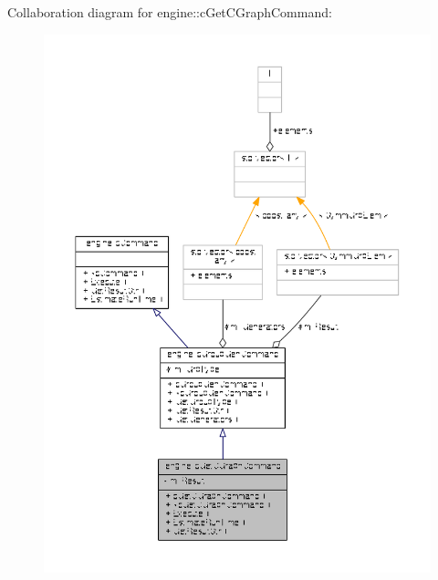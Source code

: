 Collaboration diagram for engine\-:\-:c\-Get\-C\-Graph\-Command\-:
\nopagebreak
\begin{figure}[H]
\begin{center}
\leavevmode
\includegraphics[width=350pt]{classengine_1_1cGetCGraphCommand__coll__graph}
\end{center}
\end{figure}
